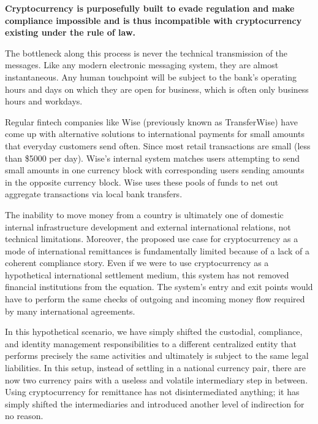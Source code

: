 
\begin{infobox}
 \textbf{
   Cryptocurrency is purposefully built to evade regulation and make compliance impossible and is thus incompatible with cryptocurrency existing under the rule of law.
  }
\end{infobox}

The bottleneck along this process is never the technical transmission of the
messages. Like any modern electronic messaging system, they are almost
instantaneous. Any human touchpoint will be subject to the bank's operating
hours and days on which they are open for business, which is often only business
hours and workdays.

Regular fintech companies like Wise (previously known as TransferWise) have come
up with alternative solutions to international payments for small amounts that
everyday customers send often. Since most retail transactions are small (less
than \$5000 per day). Wise's internal system matches users attempting to send
small amounts in one currency block with corresponding users sending amounts in
the opposite currency block.  Wise uses these pools of funds to net out
aggregate transactions via local bank transfers.

The inability to move money from a country is ultimately one of domestic
internal infrastructure development and external international relations, not
technical limitations. Moreover, the proposed use case for cryptocurrency as a
mode of international remittances is fundamentally limited because of a lack of
a coherent compliance story. Even if we were to use cryptocurrency as a
hypothetical international settlement medium, this system has not removed
financial institutions from the equation. The system's entry and exit points
would have to perform the same checks of outgoing and incoming money flow
required by many international agreements.


In this hypothetical scenario, we have simply shifted the custodial, compliance,
and identity management responsibilities to a different centralized entity that
performs precisely the same activities and ultimately is subject to the same
legal liabilities. In this setup, instead of settling in a national currency
pair, there are now two currency pairs with a useless and volatile intermediary
step in between. Using cryptocurrency for remittance has not disintermediated
anything; it has simply shifted the intermediaries and introduced another level
of indirection for no reason.

